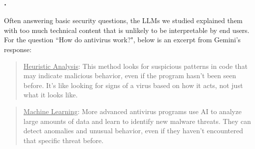 \if {}
    \subsubsection{\ResponsesGearedTowardsDevelopers.}
\fi
    Often answering basic security questions, the LLMs we studied explained them with too much technical content that is unlikely to be interpretable by end users. For the question “How do antivirus work?", below is an excerpt from Gemini's response:

    \begin{quote}
    \uline{Heuristic Analysis}: This method looks for suspicious patterns in code that may indicate malicious behavior, even if the program hasn't been seen before. It's like looking for signs of a virus based on how it acts, not just what it looks like.
    \end{quote}
    \begin{quote}
    \uline{Machine Learning}: More advanced antivirus programs use AI to analyze large amounts of data and learn to identify new malware threats. They can detect anomalies and unusual behavior, even if they haven't encountered that specific threat before.
    \end{quote}